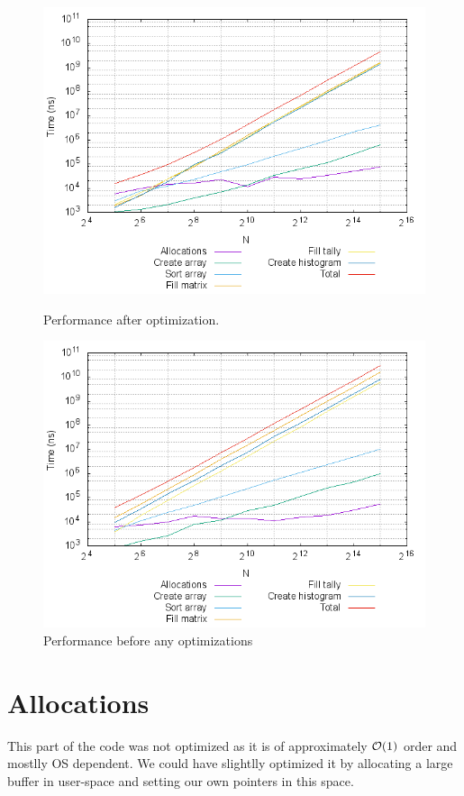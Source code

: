 \begin{figure}[!Hhp]
  \centering
  \includegraphics[width=\textwidth]{plots/timmings.png}
  \caption{Performance after optimization.}
  \label{fig:amd_fast}
  \includegraphics[width=\textwidth]{plots/timmings_reference.png}
  \caption{Performance before any optimizations}
  \label{fig:amd_slow}
\end{figure}

\section{Allocations}
This part of the code was not optimized as it is of approximately $\mathcal{O}(1)$ order and mostlly OS dependent. We could have slightlly optimized it by allocating a large buffer
in user-space and setting our own pointers in this space.

